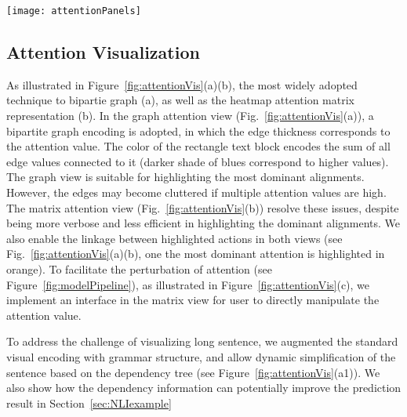 \begin{figure*}[t]
\centering
\vspace{-2mm}
 \texttt{[image: attentionPanels]}
  \vspace{-3mm}
 \caption{
Attention visualization. In the graph attention view (a), a bipartite graph encoding is adopted, in which the edge thickness corresponds to the attention value. In the matrix attention view (b), the entries of $i^{th}$ row represent the probabilities of words in hypotheses align to the $i^{th}$ word in the premise.
The user can alter the attention values via the pop-up interface illustrated in (c).
We overlay the dependency tree ($a_1$) grammar structure to highlight important words and allow simplification of complex sentence based on the dependency tree.
%
For highly asymmetric attention relationship, we utilized a zoomable hierarchical visual representation (d).
}
\vspace{-3mm}
\label{fig:attentionVis}
\end{figure*}

\subsection{Attention Visualization}
As illustrated in Figure~\ref{fig:attentionVis}(a)(b), the most widely adopted technique to bipartie graph (a), as well as the heatmap attention matrix representation (b). 
%
In the graph attention view (Fig.~\ref{fig:attentionVis}(a)), a bipartite graph encoding is adopted, in which the edge thickness corresponds to the attention value. The color of the rectangle text block encodes the sum of all edge values connected to it (darker shade of blues correspond to higher values).
The graph view is suitable for highlighting the most dominant alignments. However, the edges may become cluttered if multiple attention values are high. The matrix attention view (Fig.~\ref{fig:attentionVis}(b)) resolve these issues, despite being more verbose and less efficient in highlighting the dominant alignments. 
We also enable the linkage between highlighted actions in both views (see Fig.~\ref{fig:attentionVis}(a)(b), one the most dominant attention is highlighted in orange).
%
To facilitate the perturbation of attention (see Figure~\ref{fig:modelPipeline}), as illustrated in Figure~\ref{fig:attentionVis}(c), we implement an interface in the matrix view for user to directly manipulate the attention value.

To address the challenge of visualizing long sentence, we augmented the standard visual encoding with grammar structure, and allow dynamic simplification of the sentence based on the dependency tree (see Figure~\ref{fig:attentionVis}(a1)). We also show how the dependency information can potentially improve the prediction result in Section~\ref{sec:NLIexample}

